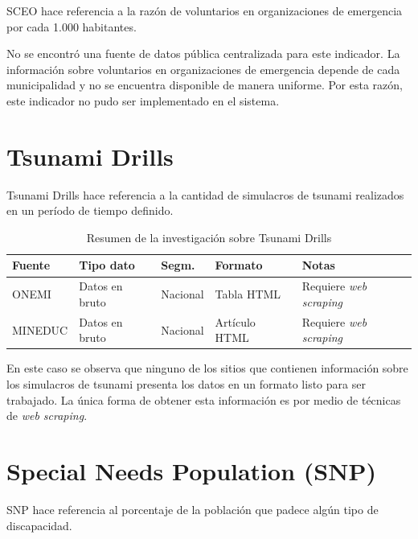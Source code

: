 \documentclass[12pt,letterpaper,oneside]{report}
\begin{document}
SCEO hace referencia a la raz\'on de voluntarios en organizaciones de emergencia por cada 1.000 habitantes.

No se encontr\'o una fuente de datos p\'ublica centralizada para este indicador. La informaci\'on sobre voluntarios en organizaciones de emergencia depende de cada municipalidad y no se encuentra disponible de manera uniforme. Por esta raz\'on, este indicador no pudo ser implementado en el sistema.

\section{Tsunami Drills}
\label{sec:td}

Tsunami Drills hace referencia a la cantidad de simulacros de tsunami realizados en un per\'iodo de tiempo definido.

\begin{table}[H]
\centering
\caption{Resumen de la investigaci\'on sobre Tsunami Drills}
\label{tab:td}
\begin{tabular}{|p{3cm}|p{2.5cm}|p{2cm}|p{2cm}|p{3cm}|}
\hline
\textbf{Fuente} & \textbf{Tipo dato} & \textbf{Segm.} & \textbf{Formato} & \textbf{Notas} \\
\hline
ONEMI \parencite{onemi} & Datos en bruto & Nacional & Tabla HTML & Requiere \textit{web scraping} \\
\hline
MINEDUC \parencite{mineduc2022} & Datos en bruto & Nacional & Art\'iculo HTML & Requiere \textit{web scraping} \\
\hline
\end{tabular}
\end{table}

En este caso se observa que ninguno de los sitios que contienen informaci\'on sobre los simulacros de tsunami presenta los datos en un formato listo para ser trabajado. La \'unica forma de obtener esta informaci\'on es por medio de t\'ecnicas de \textit{web scraping}.

\section{Special Needs Population (SNP)}
\label{sec:snp}

SNP hace referencia al porcentaje de la poblaci\'on que padece alg\'un tipo de discapacidad.
\end{document}
